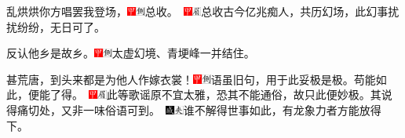 乱烘烘你方唱罢我登场，{\includegraphics[width=3mm]{../Images/00002}\includegraphics[width=3mm]{../Images/00011}\footnotesize \kaishu 总收。　\includegraphics[width=3mm]{../Images/00002}\includegraphics[width=3mm]{../Images/00010}\footnotesize \kaishu 总收古今亿兆痴人，共历幻场，此幻事扰扰纷纷，无日可了。}

反认他乡是故乡。{\includegraphics[width=3mm]{../Images/00002}\includegraphics[width=3mm]{../Images/00011}\footnotesize \kaishu 太虚幻境、青埂峰一并结住。}

甚荒唐，到头来都是为他人作嫁衣裳！{{\includegraphics[width=3mm]{../Images/00002}\includegraphics[width=3mm]{../Images/00011}\footnotesize \kaishu 语虽旧句，用于此妥极是极。苟能如此，便能了得。　\includegraphics[width=3mm]{../Images/00002}\includegraphics[width=3mm]{../Images/00010}\footnotesize \kaishu 此等歌谣原不宜太雅，恐其不能通俗，故只此便妙极。其说得痛切处，又非一味俗语可到。　}\includegraphics[width=3mm]{../Images/00005}\includegraphics[width=3mm]{../Images/00012}\footnotesize \kaishu 谁不解得世事如此，有龙象力者方能放得下。}

